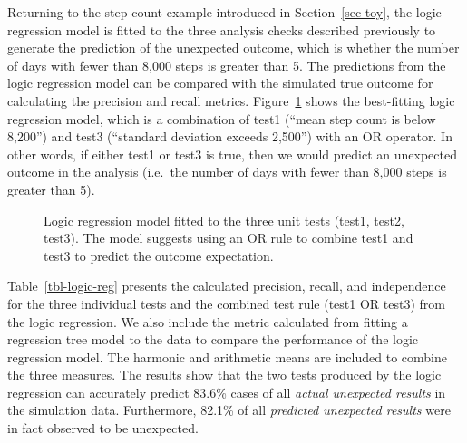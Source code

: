 \documentclass[
  12pt,
]{interact}
\begin{document}
Returning to the step count example introduced in Section~\ref{sec-toy},
the logic regression model is fitted to the three analysis checks
described previously to generate the prediction of the unexpected
outcome, which is whether the number of days with fewer than 8,000 steps
is greater than 5. The predictions from the logic regression model can
be compared with the simulated true outcome for calculating the
precision and recall metrics. Figure~\ref{fig-logic-reg} shows the
best-fitting logic regression model, which is a combination of test1
(``mean step count is below 8,200'') and test3 (``standard deviation
exceeds 2,500'') with an OR operator. In other words, if either test1 or
test3 is true, then we would predict an unexpected outcome in the
analysis (i.e.~the number of days with fewer than 8,000 steps is greater
than 5).

\label{cell-fig-logic-reg}
\begin{figure}[H]


\caption{\label{fig-logic-reg}Logic regression model fitted to the three
unit tests (test1, test2, test3). The model suggests using an OR rule to
combine test1 and test3 to predict the outcome expectation.}

\end{figure}%

Table~\ref{tbl-logic-reg} presents the calculated precision, recall, and
independence for the three individual tests and the combined test rule
(test1 OR test3) from the logic regression. We also include the metric
calculated from fitting a regression tree model to the data to compare
the performance of the logic regression model. The harmonic and
arithmetic means are included to combine the three measures. The results
show that the two tests produced by the logic regression can accurately
predict 83.6\% cases of all \emph{actual unexpected results} in the
simulation data. Furthermore, 82.1\% of all \emph{predicted unexpected
results} were in fact observed to be unexpected.
\end{document}
